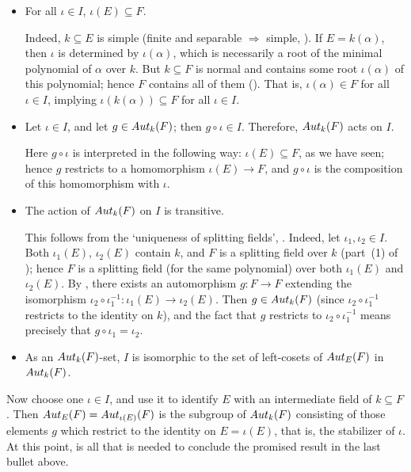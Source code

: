 \begin{itemize}
\item For all $\iota \in I$, $\iota(E) \subseteq F$.

  Indeed, $k \subseteq E$ is simple (finite and separable
  $\Rightarrow$ simple, ). If $E = k(\alpha)$,
  then $\iota$ is determined by $\iota(\alpha)$, which is necessarily
  a root of the minimal polynomial of $\alpha$ over $k$. But
  $k \subseteq F$ is normal and contains some root $\iota(\alpha)$ of
  this polynomial; hence $F$ contains all of them
  (). That is, $\iota(\alpha) \in F$ for all
  $\iota \in I$, implying $\iota(k(\alpha)) \subseteq F$ for all
  $\iota \in I$.
\item Let $\iota \in I$, and let $g \in Aut_k(F)$; then
  $g \circ \iota \in I$. Therefore, $Aut_k(F)$ acts on $I$.

  Here $g \circ \iota$ is interpreted in the following way:
  $\iota(E) \subseteq F$, as we have seen; hence $g$ restricts to a
  homomorphism $\iota(E) \to F$, and $g \circ \iota$ is the
  composition of this homomorphism with $\iota$.
\item The action of $Aut_k(F)$ on $I$ is transitive.

  This follows from the `uniqueness of splitting fields',
  .  Indeed, let $\iota_1, \iota_2 \in I$. Both
  $\iota_1(E)$, $\iota_2(E)$ contain $k$, and $F$ is a splitting field
  over $k$ (part~(1) of ); hence $F$ is a
  splitting field (for the same polynomial) over both $\iota_1(E)$ and
  $\iota_2(E)$. By , there exists an automorphism
  $g : F \to F$ extending the isomorphism
  $\iota_2 \circ \iota_1^{-1} : \iota_1(E) \to \iota_2(E)$.  Then
  $g \in Aut_k(F)$ (since $\iota_2 \circ \iota_1^{-1}$ restricts to
  the identity on $k$), and the fact that $g$ restricts to
  $\iota_2 \circ \iota_1^{-1}$ means precisely that
  $g \circ \iota_1 = \iota_2$.
\item As an $Aut_k(F)$-set, $I$ is isomorphic to the set of
  left-cosets of $Aut_E(F)$ in $Aut_k(F)$.
\end{itemize}

Now choose one $\iota \in I$, and use it to identify $E$ with an
intermediate field of $k \subseteq F$. Then
$Aut_E(F) = Aut_{\iota(E)}(F)$ is the subgroup of $Aut_k(F)$
consisting of those elements $g$ which restrict to the identity on
$E = \iota(E)$, that is, the stabilizer of $\iota$. At this point,
 is all that is needed
to conclude the promised result in the last bullet above.

